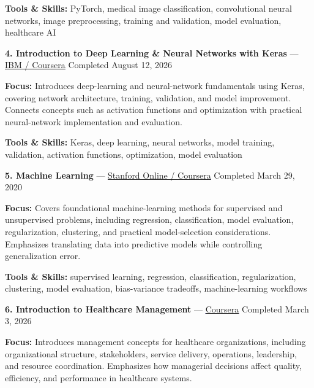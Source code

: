 \documentclass[9pt,letterpaper]{extarticle}
\begin{document}
{\small\textbf{Tools \& Skills:} PyTorch, medical image classification, convolutional neural networks, image preprocessing, training and validation, model evaluation, healthcare AI\par}
\vspace{2pt}
\noindent\textbf{4. Introduction to Deep Learning \& Neural Networks with Keras} {\small --- \textcolor{blue}{\underline{\href{https://www.coursera.org/account/accomplishments/verify/Y6NP4GWLS4DZ}{IBM / Coursera}}} \textbar{} Completed \textbar{} August 12, 2026}\par
\textbf{Focus:} Introduces deep-learning and neural-network fundamentals using Keras, covering network architecture, training, validation, and model improvement. Connects concepts such as activation functions and optimization with practical neural-network implementation and evaluation.\par
{\small\textbf{Tools \& Skills:} Keras, deep learning, neural networks, model training, validation, activation functions, optimization, model evaluation\par}
\vspace{2pt}
\noindent\textbf{5. Machine Learning} {\small --- \textcolor{blue}{\underline{\href{https://www.coursera.org/account/accomplishments/verify/VU3Y5TBLVLZT}{Stanford Online / Coursera}}} \textbar{} Completed \textbar{} March 29, 2020}\par
\textbf{Focus:} Covers foundational machine-learning methods for supervised and unsupervised problems, including regression, classification, model evaluation, regularization, clustering, and practical model-selection considerations. Emphasizes translating data into predictive models while controlling generalization error.\par
{\small\textbf{Tools \& Skills:} supervised learning, regression, classification, regularization, clustering, model evaluation, bias-variance tradeoffs, machine-learning workflows\par}
\vspace{2pt}
\noindent\textbf{6. Introduction to Healthcare Management} {\small --- \textcolor{blue}{\underline{\href{https://www.coursera.org/account/accomplishments/verify/8CIQHG3YD4HM}{Coursera}}} \textbar{} Completed \textbar{} March 3, 2026}\par
\textbf{Focus:} Introduces management concepts for healthcare organizations, including organizational structure, stakeholders, service delivery, operations, leadership, and resource coordination. Emphasizes how managerial decisions affect quality, efficiency, and performance in healthcare systems.\par
\end{document}
